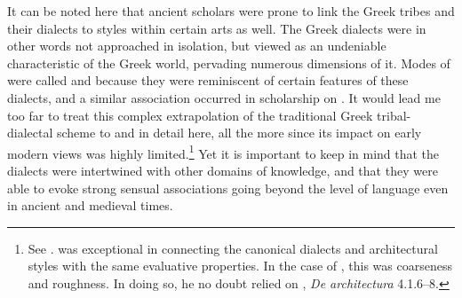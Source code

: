 \begin{longtable}{>{\raggedright\arraybackslash\hangindent=.5em}p{3cm}>{\raggedright\arraybackslash}p{\textwidth - 3\tabcolsep - 3cm}}
\end{longtable}

It can be noted here that ancient scholars were prone to link the Greek tribes and their dialects to styles within certain arts as well. The Greek dialects were in other words not approached in isolation, but viewed as an undeniable characteristic of the Greek world, pervading numerous dimensions of it. Modes of  were called  and  because they were reminiscent of certain features of these dialects, and a similar association occurred in scholarship on . It would lead me too far to treat this complex extrapolation of the traditional Greek tribal-dialectal scheme to  and  in detail here, all the more since its impact on early modern views was highly limited.\footnote{See \citet{Cassio1984}. \citet[118]{Mazzocchi1754} was exceptional in connecting the canonical dialects and architectural styles with the same evaluative properties. In the case of , this was coarseness and roughness. In doing so, he no doubt relied on , \textit{De architectura} 4.1.6–8.} Yet it is important to keep in mind that the dialects were intertwined with other domains of knowledge, and that they were able to evoke strong sensual associations going beyond the level of language even in ancient and medieval times.

